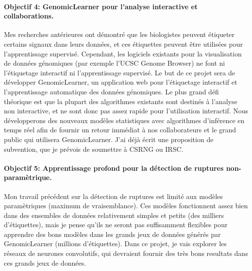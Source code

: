 \documentclass{article}
\begin{document}
\paragraph{Objectif 4: GenomicLearner pour l'analyse interactive et
  collaborations.} Mes recherches antérieures ont démontré que les
biologistes peuvent étiqueter certains signaux dans leurs données, et
ces étiquettes peuvent être utilisées pour l'apprentissage
supervisé. Cependant, les logiciels existants pour la visualisation de
données génomiques (par exemple l'UCSC Genome Browser) ne font ni
l'étiquetage interactif ni l'apprentissage supervisé. Le but de ce
projet sera de développer GenomicLearner, un application web pour
l'étiquetage interactif et l'apprentissage automatique des données
génomiques. Le plus grand défi théorique est que la plupart des
algorithmes existants sont destinés à l'analyse non interactive, et ne
sont donc pas assez rapide pour l'utilisation interactif. Nous
développerons des nouveaux modèles statistiques avec algorithmes
d'inférence en temps réel afin de fournir un retour immédiat à nos
collaborateurs et le grand public qui utilisera GenomicLearner. J'ai
déjà écrit une proposition de subvention, que je prévois de soumettre
à CSRNG ou IRSC.

\paragraph{Objectif 5: Apprentissage profond pour la détection de
  ruptures non-paramètrique.} Mon travail précédent sur la détection
de ruptures est limité aux modèles paramètriques (maximum de
vraisemblance). Ces modèles fonctionnent assez bien dans des ensembles
de données relativement simples et petits (des milliers d'étiquettes),
mais je pense qu'ils ne seront pas suffisamment flexibles pour
apprendre des bons modèles dans les grands jeux de données générés par
GenomicLearner (millions d'étiquettes). Dans ce projet, je vais
explorer les réseaux de neurones convolutifs, qui devraient fournir
des très bons resultats dans ces grands jeux de données.
 


\end{document}
